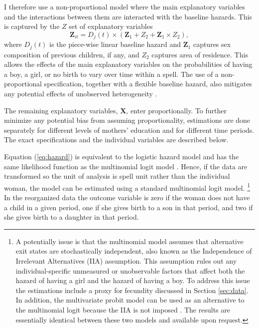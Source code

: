 \documentclass[12pt,letterpaper]{article}
\begin{document}
I therefore use a non-proportional model where the main 
explanatory variables and the interactions between them are interacted with the baseline hazards.
This is captured by the $Z$ set of explanatory variables
\begin{equation}
 \mathbf{Z}_{it} = D_j(t) \times (\mathbf{Z}_1 + Z_2 + \mathbf{Z}_1 \times Z_2),
\end{equation}
where $D_j(t)$ is the piece-wise linear baseline hazard and $\mathbf{Z}_1$ captures sex 
composition of previous children, if any, and $Z_2$ captures area of residence.
This allows the effects of the main explanatory variables 
on the probabilities of having a boy, a girl, or no birth to vary over time within a spell.
The use of a non-proportional specification, together with a flexible baseline hazard, 
also mitigates any potential effects of unobserved heterogeneity \citep{Dolton1995}.

The remaining explanatory variables, $\mathbf{X}$, enter proportionally.
To further minimize any potential bias from assuming proportionality, estimations are 
done separately for different levels of mothers' education and for different time periods.
The exact specifications and the individual variables are described below.

Equation (\ref{eq:hazard}) is equivalent to the logistic hazard model and has the same 
likelihood function as the multinomial logit model \citep{allison82,jenkins95}.
Hence, if the data are transformed so the unit of analysis is spell unit rather 
than the individual woman, the model can be estimated using a standard multinomial logit model.%
\footnote{
A potentially issue is that the multinomial model assumes that alternative 
exit states are stochastically independent,
also known as the Independence of Irrelevant Alternatives (IIA) assumption.
This assumption rules out any individual-specific unmeasured or 
unobservable factors that affect both the hazard of having a girl and the 
hazard of having a boy.
To address this issue the estimations include a proxy for fecundity
discussed in Section \ref{sec:data}.
In addition, the multivariate probit model can be used as an alternative
to the multinomial logit because the IIA is not imposed \citep{han90}.
The results are essentially identical between these two models and
available upon request.
}
In the reorganized data the outcome variable is zero if the
woman does not have a child in a given period, one if she gives birth to a son in that period,
and two if she gives birth to a daughter in that period.
\end{document}

